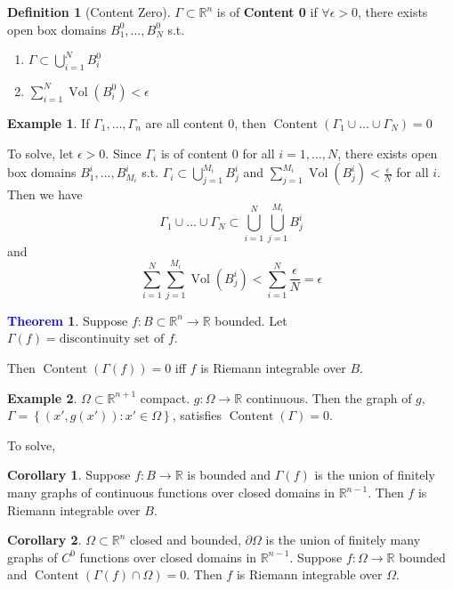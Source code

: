 \documentclass[11pt]{article}
\theoremstyle{definition}
\newtheorem{exmp}{Example}[section]
\theoremstyle{definition}
\newcommand{\R}[0]{\mathbb{R}}
\DeclareMathOperator{\Vol}{Vol}
\DeclareMathOperator{\Content}{Content}
\newtheorem{theorem}{\textcolor{blue}{Theorem}}
\newtheorem{corollary}{Corollary}
\theoremstyle{definition}
\newtheorem{definition}{\textcolor{OliveGreen}{Definition}}
\theoremstyle{remark}
\begin{document}
\begin{definition}[Content Zero]
    $\Gamma \subset \R^n$ is of \textbf{Content 0} if $\forall \epsilon > 0$, there exists open box domains $B_1^0, \dots, B_N^0$
    s.t.
    \begin{enumerate}
        \item $\Gamma \subset \bigcup_{i = 1}^N B_i^0$
        \item $\sum_{i = 1}^N \Vol(B_i^0) < \epsilon$
    \end{enumerate}  
\end{definition}

\begin{exmp}
    If $\Gamma_1, \dots, \Gamma_n$ are all content 0, then $\Content(\Gamma_1 \cup \dots \cup \Gamma_N) = 0$  

    To solve, let $\epsilon > 0$. Since $\Gamma_i$ is of content 0 for all $i = 1, \dots, N$, there exists open box domains $B_1^i, \dots, B_{M_i}^i$ s.t. $\Gamma_i \subset \bigcup_{j = 1}^{M_i} B_j^i$ and $\sum_{j = 1}^{M_i} \Vol(B_j^i) < \frac{\epsilon}{N}$ for all $i$. Then we have
    \[
    \Gamma_1 \cup \dots \cup \Gamma_N \subset \bigcup_{i = 1}^N \bigcup_{j = 1}^{M_i} B_j^i
    \]
    and
    \[
    \sum_{i = 1}^N \sum_{j = 1}^{M_i} \Vol(B_j^i) < \sum_{i = 1}^N \frac{\epsilon}{N} = \epsilon
    \] 
\end{exmp}

\begin{theorem}
    Suppose $f : B \subset \R^n \to \R$ bounded. Let $\Gamma(f) = \text{discontinuity set of } f$. 
    
    Then $\Content(\Gamma(f)) = 0$ iff $f$ is Riemann integrable over $B$.   
\end{theorem}

\begin{exmp}
    $\Omega \subset \R^{n + 1}$ compact. $g : \Omega \to \R $ continuous. Then the graph of $g$, 
    $\Gamma = \left\{ (x', g(x')) : x' \in \Omega \right\} $, satisfies $\Content(\Gamma) = 0$.
    
    To solve, 
\end{exmp}

\begin{corollary}
    Suppose $f : B \to \R$ is bounded and $\Gamma(f)$ is the union of finitely many graphs of continuous functions over closed
    domains in $\R^{n-1}$. Then $f$ is Riemann integrable over $B$.   
\end{corollary}

\begin{corollary}
    $\Omega \subset \R^n$ closed and bounded, $\partial \Omega$ is the union of finitely many graphs of
    $C^0$ functions over closed domains in $\R^{n - 1}$. Suppose $f : \Omega \to \R$ bounded and
    $\Content(\Gamma(f) \cap \Omega) = 0$. Then $f$ is Riemann integrable over $\Omega$.      
\end{corollary}
\end{document}
